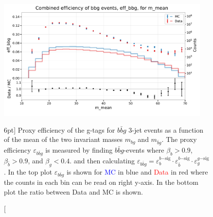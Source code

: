 \documentclass[a4paper, twoside, nobib]{tufte-book}
\begin{document}
\begin{figure}
  \includegraphics[width=0.95\textwidth, trim=0 0 0 40, clip]{figures/quarks/eff_bbg_m_mean-down_sample=1.00-ML_vars=vertex-selection=b-ejet_min=4-n_iter_RS_lgb=99-n_iter_RS_xgb=9-cdot_cut=0.90-version=19.pdf}
  \caption[g-Tagging proxy efficiency for $b\bar{b}g$-events as function of the mean invariant mass][6pt]
          {Proxy efficiency of the g-tags for $b\bar{b}g$ 3-jet events as a function of the mean of the two invariant masses $m_{bg}$ and $m_{\bar{b}g}$. The proxy efficiency $\varepsilon_{b\bar{b}g}$ is measured by finding $b\bar{b}g$-events where $\beta_b > 0.9$, $\beta_{\bar{b}}>0.9$, and $\beta_g < 0.4$. and then calculating  $\varepsilon_{b\bar{b}g} = \varepsilon_b^{b\mathrm{-sig}} \cdot \varepsilon_{\bar{b}}^{b\mathrm{-sig}} \cdot  \varepsilon_g^{g\mathrm{-sig}} $. In the top plot $\varepsilon_{b\bar{b}g}$ is shown for \textcolor{blue}{MC} in blue and \textcolor{red}{Data} in red where the counts in each bin can be read on right y-axis. In the bottom plot the ratio between Data and MC is shown.
          } 
  \label{fig:q:effiency_btag_bbg_m_mean}
\end{figure}
\end{document}
